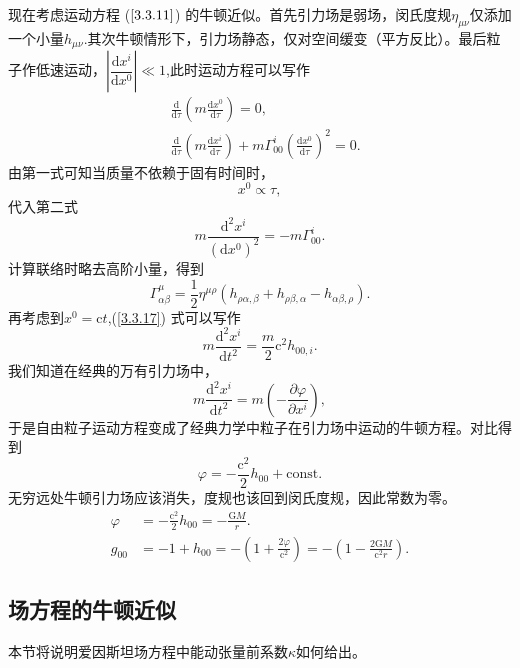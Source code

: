 \documentclass[11pt, a4paper, oneside, onecolumn]{ctexart}
\numberwithin{equation}{subsection}
\begin{document}
现在考虑运动方程 ($\ref{3.3.11}$) 的牛顿近似。首先引力场是弱场，闵氏度规$\eta_{\mu\nu}$仅添加一个小量$h_{\mu\nu}$.其次牛顿情形下，引力场静态，仅对空间缓变（平方反比）。最后粒子作低速运动，$\left\vert{}\dfrac{\mathrm{d}x^{i}}{\mathrm{d}x^{0}}\right\vert{}\ll1$,此时运动方程可以写作
\begin{align}
&\frac{\mathrm{d}}{\mathrm{d}\tau}\left(m\frac{\mathrm{d}x^{0}}{\mathrm{d}\tau}\right)=0,\\
&\frac{\mathrm{d}}{\mathrm{d}\tau}\left(m\frac{\mathrm{d}x^{i}}{\mathrm{d}\tau}\right)+m\Gamma_{00}^{i}\left(\frac{\mathrm{d}x^{0}}{\mathrm{d}\tau}\right)^{2}=0.
\end{align}
由第一式可知当质量不依赖于固有时间时，
\begin{equation}
x^{0}\propto{}\tau,
\end{equation}
代入第二式
\begin{equation}
m\frac{\mathrm{d}^{2}x^{i}}{\left(\mathrm{d}x^{0}\right)^{2}}=-m\Gamma_{00}^{i}.\label{3.3.17}
\end{equation}
计算联络时略去高阶小量，得到
\begin{equation}
\Gamma_{\alpha\beta}^{\mu}=\frac{1}{2}\eta^{\mu\rho}\left(h_{\rho\alpha,\beta}+h_{\rho\beta,\alpha}-h_{\alpha\beta,\rho}\right).
\end{equation}
再考虑到$x^{0}=\mathrm{c}t$,(\ref{3.3.17}) 式可以写作
\begin{equation}
m\frac{\mathrm{d}^{2}x^{i}}{\mathrm{d}t^{2}}=\frac{m}{2}\mathrm{c}^{2}h_{00,i}.
\end{equation}
我们知道在经典的万有引力场中，
\begin{equation}
m\frac{\mathrm{d}^{2}x^{i}}{\mathrm{d}t^{2}}=m\left(-\frac{\partial{}\varphi}{\partial{}x^{i}}\right),
\end{equation}
于是自由粒子运动方程变成了经典力学中粒子在引力场中运动的牛顿方程。对比得到
\begin{equation}
\varphi=-\frac{\mathrm{c}^{2}}{2}h_{00}+\text{const}.
\end{equation}
无穷远处牛顿引力场应该消失，度规也该回到闵氏度规，因此常数为零。
\begin{align}
\varphi&=-\frac{\mathrm{c}^{2}}{2}h_{00}=-\frac{\mathrm{G}M}{r}.\\
g_{00}&=-1+h_{00}=-\left(1+\frac{2\varphi}{\mathrm{c}^{2}}\right)=-\left(1-\frac{2\mathrm{G}M}{\mathrm{c}^{2}r}\right).
\end{align}

\subsection{场方程的牛顿近似}
本节将说明爱因斯坦场方程中能动张量前系数$\kappa$如何给出。
\end{document}
